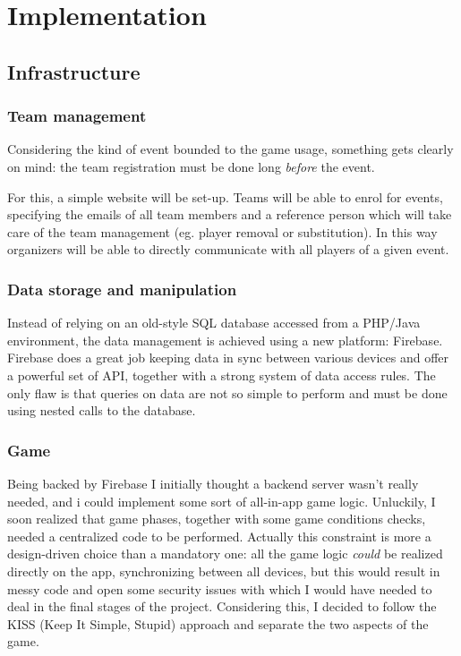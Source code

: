 \chapter{Implementation}

	\section{Infrastructure}
		
		\subsection{Team management}
		
			Considering the kind of event bounded to the game usage, something gets clearly on mind: the team registration must be done long \emph{before} the event.
			
			For this, a simple website will be set-up. 
			Teams will be able to enrol for events, specifying the emails of all team members and a reference person which will take care of the team management (eg. player removal or substitution).
			In this way organizers will be able to directly communicate with all players of a given event.
		
		\subsection{Data storage and manipulation}
			
			Instead of relying on an old-style SQL database accessed from a PHP/Java environment, the data management is achieved using a new platform: Firebase.
			Firebase does a great job keeping data in sync between various devices and offer a powerful set of API, together with a strong system of data access rules.
			The only flaw is that queries on data are not so simple to perform and must be done using nested calls to the database.
		
		\subsection{Game}
		
			Being backed by Firebase I initially thought a backend server wasn't really needed, and i could implement some sort of all-in-app game logic.
			Unluckily, I soon realized that game phases, together with some game conditions checks, needed a centralized code to be performed.
			Actually this constraint is more a design-driven choice than a mandatory one: all the game logic \emph{could} be realized directly on the app, synchronizing between all devices, but this would result in messy code and open some security issues with which I would have needed to deal in the final stages of the project.
			Considering this, I decided to follow the KISS (Keep It Simple, Stupid) approach and separate the two aspects of the game.
			
